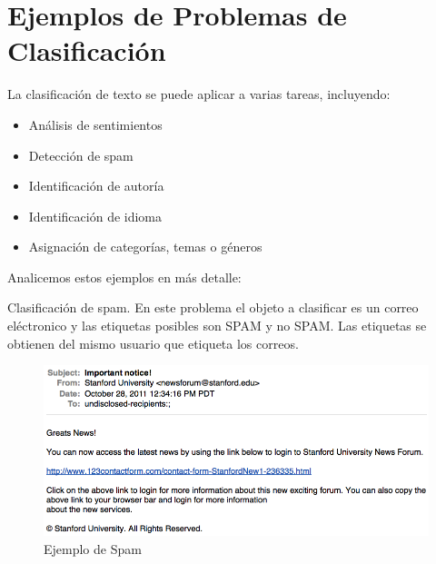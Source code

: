 \documentclass[11pt,fleqn]{book} %
\begin{document}
\section{Ejemplos de Problemas de Clasificación}
La clasificación de texto se puede aplicar a varias tareas, incluyendo:

\begin{itemize}
    \item Análisis de sentimientos
    \item Detección de spam
    \item Identificación de autoría
    \item Identificación de idioma
    \item Asignación de categorías, temas o géneros
\end{itemize}

Analicemos estos ejemplos en más detalle:

\begin{example}
Clasificación de spam. En este problema el objeto a clasificar es un correo eléctronico y las etiquetas posibles son SPAM y no SPAM. Las etiquetas se obtienen del mismo usuario que etiqueta los correos.

\begin{figure}[h]
    \centering
    \includegraphics[scale = 0.35]{pics/spam.png}
    \caption{Ejemplo de Spam}
    \label{fig:chomsky}
\end{figure}
 
 
\end{example}
\end{document}
